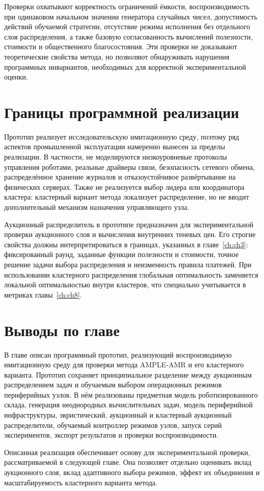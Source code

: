 Проверки охватывают корректность ограничений ёмкости, воспроизводимость при одинаковом начальном значении генератора случайных чисел, допустимость действий обучаемой стратегии, отсутствие режима исполнения без отдельного слоя распределения, а также базовую согласованность вычислений полезности, стоимости и общественного благосостояния. Эти проверки не доказывают теоретические свойства метода, но позволяют обнаруживать нарушения программных инвариантов, необходимых для корректной экспериментальной оценки.

\section{Границы программной реализации}

Прототип реализует исследовательскую имитационную среду, поэтому ряд аспектов промышленной эксплуатации намеренно вынесен за пределы реализации. В частности, не моделируются низкоуровневые протоколы управления роботами, реальные драйверы связи, безопасность сетевого обмена, распределённое хранение журналов и отказоустойчивое развёртывание на физических серверах. Также не реализуется выбор лидера или координатора кластера: кластерный вариант метода локализует распределение, но не вводит дополнительный механизм назначения управляющего узла.

Аукционный распределитель в прототипе предназначен для экспериментальной проверки аукционного слоя и вычисления внутренних теневых цен. Его строгие свойства должны интерпретироваться в границах, указанных в главе~\ref{ch:ch3}: фиксированный раунд, заданные функции полезности и стоимости, точное решение задачи выбора распределения и неизменность правила платежей. При использовании кластерного распределения глобальная оптимальность заменяется локальной оптимальностью внутри кластеров, что специально учитывается в метриках главы~\ref{ch:ch8}.

\section{Выводы по главе}

В главе описан программный прототип, реализующий воспроизводимую имитационную среду для проверки метода AMPLE-AMR и его кластерного варианта. Прототип сохраняет принципиальное разделение между аукционным распределением задач и обучаемым выбором операционных режимов периферийных узлов. В нём реализованы предметная модель роботизированного склада, генерация неоднородных вычислительных задач, модель периферийной инфраструктуры, эвристический, аукционный и кластерный аукционный распределители, обучаемый контроллер режимов узлов, запуск серий экспериментов, экспорт результатов и проверки воспроизводимости.

Описанная реализация обеспечивает основу для экспериментальной проверки, рассматриваемой в следующей главе. Она позволяет отдельно оценивать вклад аукционного слоя, вклад адаптивного выбора режимов, эффект их объединения и масштабируемость кластерного варианта метода.
